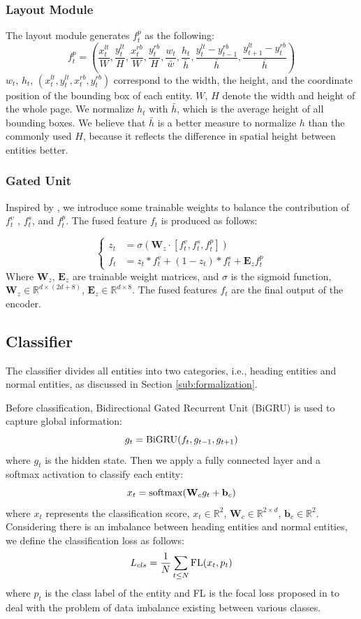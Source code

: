 \documentclass[a4paper,conference]{IEEEtran}
\begin{document}
\subsubsection{Layout Module} The layout module generates $f^{p}_{t}$  as the following:
$$ {f}^{p}_{t}=(\frac{x_t^{lt}}{{W}}, \frac{y_t^{lt}}{{H}}, \frac{x_t^{rb}}{{W}}, \frac{y_t^{rb}}{{H}}, \frac{w_t}{\bar{w}}, \frac{h_t}{\bar{ h}}, \frac{y_t^{lt} - y_{t-1}^{rb}}{\bar{h}}, \frac{y_{t+1}^{lt} - y_{t}^{rb}}{\bar{h}})$$
$w_t$, $h_t$, $(x_t^{lt} , y_t^{lt}, x_t^{rb} , y_t^{rb})$ correspond to the width, the height, and the coordinate position of the bounding box of each entity. ${W}$, ${H}$ denote the width and height of the whole page. We normalize $h_t$ with $\bar{h}$, which is the average height of all bounding boxes. We believe that $\bar{h}$ is a better measure to normalize $h$ than the commonly used $H$, because it reflects the difference in spatial height between entities better.

\subsubsection{Gated Unit\label{sec:fuse}}
Inspired by \cite{gateunit} \cite{srn}, we introduce some trainable weights to balance the contribution of $ {f}^{v}_t$ , $ {f}^{s}_t$, and $ {f}^{p}_t$. The fused feature $f_t$ is produced as follows:

$$\left\{\begin{aligned}
z_{t} &=\sigma\left(\mathbf{W}_{z} \cdot\left[f^{v}_t, f^{s}_t,f^{p}_t\right]\right) \\
f_{t} &=z_{t} * f^{v}_t+\left(1-z_t\right) * f^{s}_t + \mathbf{E}_{z}f^p_t
\end{aligned}\right.$$
Where $\mathbf{W}_{z}$, $\mathbf{E}_z$ are trainable weight matrices, and $\sigma$ is the sigmoid function, $\mathbf{W}_{z} \in \mathbb{R}^{d \times (2d+8)}$, $\mathbf{E}_{z} \in \mathbb{R}^{d \times 8}$. The fused features $f_t$ are the final output of the encoder.

\subsection{Classifier\label{sub:class}}
The classifier divides all entities into two categories, i.e., heading entities and normal entities, as discussed in Section \ref{sub:formalization}.

Before classification, Bidirectional Gated Recurrent Unit (BiGRU)\cite{gru} is used to capture global information:
$$g_t= {\rm{BiGRU}}(f_t, g_{t-1}, g_{t+1})$$
where $g_t$ is the hidden state. Then we apply a fully connected layer and a softmax activation to classify each entity:
$$x_t={\rm softmax}(\mathbf{W}_{c}g_t+\mathbf{b}_{c})$$
where $x_t$ represents the classification score, $x_t \in \mathbb{R}^{2}$, $\mathbf{W}_{c} \in \mathbb{R}^{2 \times d}$, $\mathbf{b}_{c} \in \mathbb{R}^{2}$. Considering there is an imbalance between heading entities and normal entities, we define the classification loss as follows: 
$$L_{cls}=\frac{1}{N}\sum_{t \le N} {\rm FL}(x_t, p_t)$$
where $p_t$ is the class label of the entity and {\rm FL} is the focal loss proposed in \cite{focalloss} to deal with the problem of data imbalance existing between various classes.
\end{document}
